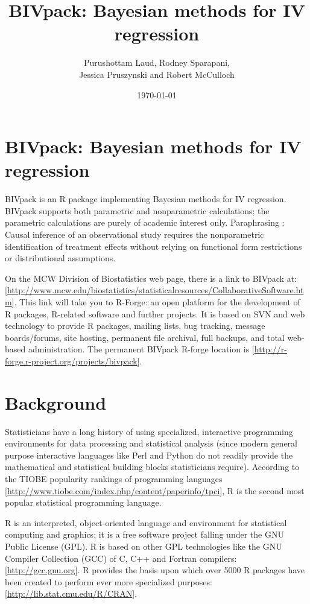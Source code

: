 \documentclass[12pt,oneside]{article}
\title{BIVpack: Bayesian methods for IV regression}
\author{Purushottam Laud, Rodney Sparapani,\\
Jessica Pruszynski and Robert McCulloch}
\date{\today}
\begin{document}
\maketitle

\section{BIVpack: Bayesian methods for IV regression}

BIVpack is an R package implementing Bayesian methods for IV
regression.  BIVpack supports both parametric and nonparametric
calculations; the parametric calculations are purely of academic
interest only.  Paraphrasing \citet{ImbeAngr94}: Causal inference of
an observational study requires the nonparametric identification of
treatment effects without relying on functional form restrictions or
distributional assumptions.

On the MCW Division of Biostatistics web page, there is a link to
BIVpack at:
[\url{http://www.mcw.edu/biostatistics/statisticalresources/CollaborativeSoftware.htm}].  This link will take you to R-Forge: an open platform for the
development of R packages, R-related software and further projects. It
is based on SVN \citep{CollFitz11} and web technology to provide R
packages, mailing lists, bug tracking, message boards/forums, site
hosting, permanent file archival, full backups, and total web-based
administration.  The permanent BIVpack R-forge location is
[\url{http://r-forge.r-project.org/projects/bivpack}].

\section{Background}

Statisticians have a long history of using specialized, interactive
programming environments for data processing and statistical analysis
(since modern general purpose interactive languages like Perl and Python 
do not readily provide the mathematical and statistical building
blocks statisticians require).
According to the TIOBE popularity rankings of programming languages
[\url{http://www.tiobe.com/index.php/content/paperinfo/tpci}], 
R \citep{R} is the second most popular statistical programming language.

R is an interpreted, object-oriented language and environment for
statistical computing and graphics; it is a free software project
falling under the GNU Public License (GPL).  R is based on other GPL
technologies like the GNU Compiler Collection (GCC) of C, C++ and
Fortran compilers: [\url{http://gcc.gnu.org}].  R provides the basis
upon which over 5000 R packages have been created to perform ever more
specialized purposes: [\url{http://lib.stat.cmu.edu/R/CRAN}].
\end{document}
